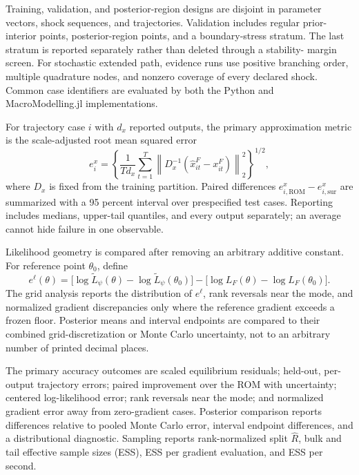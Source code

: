 \documentclass[11pt]{article}
\begin{document}
Training, validation, and posterior-region designs are disjoint in parameter
vectors, shock sequences, and trajectories. Validation includes regular
prior-interior points, posterior-region points, and a boundary-stress stratum.
The last stratum is reported separately rather than deleted through a stability-
margin screen. For stochastic extended path, evidence runs use positive
branching order, multiple quadrature nodes, and nonzero coverage of every
declared shock. Common case identifiers are evaluated by both the Python and
MacroModelling.jl implementations.

For trajectory case $i$ with $d_x$ reported outputs, the primary approximation
metric is the scale-adjusted root mean squared error
\begin{equation}
 e^{x}_i=\left\{\frac{1}{Td_x}
 \sum_{t=1}^{T}\left\|D_x^{-1}
 (\widehat x^F_{it}-x^F_{it})\right\|_2^2\right\}^{1/2},
 \label{eq:trajectory-error}
\end{equation}
where $D_x$ is fixed from the training partition. Paired differences
$e^x_{i,\mathrm{ROM}}-e^x_{i,\mathrm{sur}}$ are summarized with a 95 percent
interval over prespecified test cases. Reporting includes medians, upper-tail
quantiles, and every output separately; an average cannot hide failure in one
observable.

Likelihood geometry is compared after removing an arbitrary additive constant.
For reference point $\theta_0$, define
\begin{equation}
 e^\ell(\theta)=
 \bigl[\log\widetilde L_\psi(\theta)-
       \log\widetilde L_\psi(\theta_0)\bigr]
 -\bigl[\log L_F(\theta)-\log L_F(\theta_0)\bigr].
 \label{eq:centered-likelihood-error}
\end{equation}
The grid analysis reports the distribution of $e^\ell$, rank reversals near the
mode, and normalized gradient discrepancies only where the reference gradient
exceeds a frozen floor. Posterior means and interval endpoints are compared to
their combined grid-discretization or Monte Carlo uncertainty, not to an
arbitrary number of printed decimal places.

The primary accuracy outcomes are scaled equilibrium residuals; held-out,
per-output trajectory errors; paired improvement over the ROM with uncertainty;
centered log-likelihood error; rank reversals near the mode; and normalized
gradient error away from zero-gradient cases. Posterior comparison reports
differences relative to pooled Monte Carlo error, interval endpoint differences,
and a distributional diagnostic. Sampling reports rank-normalized split
$\widehat R$, bulk and tail effective sample sizes (ESS), ESS per gradient
evaluation, and ESS per second.
\end{document}
